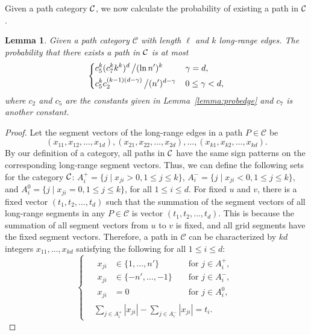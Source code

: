 \documentclass[11pt]{article}
\newtheorem{lem}{Lemma}
\begin{document}
Given a path category $\cal C$, we now calculate the probability of 
	existing a path in $\cal C$.

\begin{lem}\label{lemma:cateogoryexists}
Given a path category $\mathcal{C}$ with length $\ell$ and $k$ 
	long-range edges.
The probability that there exists a path in $\cal C$ is at most
\[
\left\{\begin{aligned}
	&c_5^k(c_7^kk^k)^d\left/(\ln n')^k\right. && \gamma =d, \\
	&c_5^kc_2^{(k-1)(d-\gamma)}\left/(n')^{d-\gamma}\right. && 0 \le \gamma < d,
\end{aligned}\right.
\]
where $c_2$ and $c_5$ are the constants given in Lemma~\ref{lemma:probedge} 
	and $c_7$ is another constant.
\end{lem}
\begin{proof}
Let the segment vectors of the long-range edges in a path $P\in\mathcal{C}$ be 
	\[(x_{11},x_{12},\ldots,x_{1d}), 
	(x_{21},x_{22},\ldots,x_{2d}), \ldots,(x_{k1},x_{k2},\ldots,x_{kd}).\]
By our definition of a category, all paths in $\cal C$ have the same
	sign patterns on the corresponding long-range segment vectors.
Thus, we can define the following sets for the category $\cal C$:
	$A_i^+=\{j\mid x_{ji}>0,1\leq j\leq k\}$, 
	$A_i^-=\{j\mid x_{ji}<0,1\leq j\leq k\}$, and 
	$A_i^0=\{j\mid x_{ji}=0,1\leq j\leq k\}$, for all
	$1\le i \le d$. 
For fixed $u$ and $v$, there is a fixed vector $(t_1,t_2,\ldots,t_d)$ 
	such that the summation of the segment vectors of 
	all long-range segments in any $P\in\mathcal{C}$ is 
	vector $(t_1,t_2,\ldots,t_d)$. 
This is because the summation of all segment vectors from $u$ to $v$ is fixed, and all grid
	segments have the fixed segment vectors.
Therefore, a path in $\mathcal{C}$ can be characterized by $kd$ 
	integers $x_{11},\ldots,x_{kd}$ satisfying the following for 
	all $1\le i \le d$:
\begin{equation} \label{eqn:req}
\left\{\begin{aligned}
& \begin{aligned}
x_{ji}&\in\{1,\ldots,n'\} && \text{ for }j\in A_i^+, \\
x_{ji}&\in\{-n',\ldots,-1\} && \text{ for }j\in A_i^-, \\
x_{ji}&=0 && \text{ for }j\in A_i^0,
\end{aligned} \\
& \sum_{j\in A_i^+}|x_{ji}|-\sum_{j\in A_i^-}|x_{ji}|=t_i .
\end{aligned}\right.
\end{equation}

\end{proof}
\end{document}
